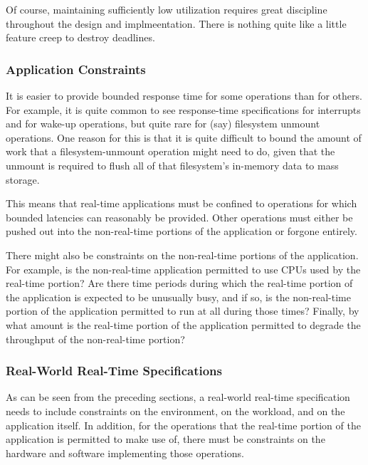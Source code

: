Of course, maintaining sufficiently low utilization requires great
discipline throughout the design and implmeentation.
There is nothing quite like a little feature creep to destroy deadlines.

\subsubsection{Application Constraints}
\label{sec:rt:Application Constraints}

It is easier to provide bounded response time for some operations than
for others.
For example, it is quite common to see response-time specifications for
interrupts and for wake-up operations, but quite rare for (say)
filesystem unmount operations.
One reason for this is that it is quite difficult to bound the amount
of work that a filesystem-unmount operation might need to do, given that
the unmount is required to flush all of that filesystem's in-memory
data to mass storage.

This means that real-time applications must be confined to operations
for which bounded latencies can reasonably be provided.
Other operations must either be pushed out into the non-real-time portions
of the application or forgone entirely.

There might also be constraints on the non-real-time portions of the
application.
For example, is the non-real-time application permitted to use CPUs used
by the real-time portion?
Are there time periods during which the real-time portion of the application
is expected to be unusually busy, and if so, is the non-real-time portion
of the application permitted to run at all during those times?
Finally, by what amount is the real-time portion of the application permitted
to degrade the throughput of the non-real-time portion?

\subsubsection{Real-World Real-Time Specifications}
\label{sec:rt:Real-World Real-Time Specifications}

As can be seen from the preceding sections, a real-world real-time
specification needs to include constraints on the environment,
on the workload, and on the application itself.
In addition, for the operations that the real-time portion of the
application is permitted to make use of, there must be constraints
on the hardware and software implementing those operations.

